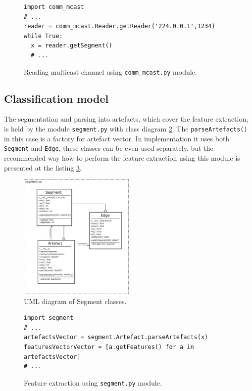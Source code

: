 \begin{figure}[!ht]
\begin{lstlisting}[style=python]
import comm_mcast
# ...
reader = comm_mcast.Reader.getReader('224.0.0.1',1234)
while True:
  x = reader.getSegment()
  # ...
\end{lstlisting}
\caption{Reading multicast channel using \texttt{comm\_mcast.py} module.\label{listing:readMCast}}
\end{figure}



\subsection*{Classification model}
The segmentation and parsing into artefacts, which cover the feature extraction, is held by the module \texttt{segment.py}
with class diagram \ref{fig:class_segment}. The \texttt{parseArtefacts()} in this case is a factory for artefact vector.
In implementation it uses both \texttt{Segment} and \texttt{Edge}, these classes can be even used separately,
but the recommended way how to perform the feature extraction using this module is presented at the listing
\ref{listing:featureExtraction}.


\begin{figure}[!ht]
\begin{center}
\includegraphics[width=0.5\textwidth]{img/class_segment.png}
\caption{UML diagram of Segment classes. \label{fig:class_segment}}
\end{center}
\end{figure}

\begin{figure}[!ht]
\begin{lstlisting}[style=python]
import segment
# ...
artefactsVector = segment.Artefact.parseArtefacts(x)
featuresVectorVector = [a.getFeatures() for a in artefactsVector]
# ...
\end{lstlisting}
\caption{Feature extraction using \texttt{segment.py} module.\label{listing:featureExtraction}}
\end{figure}


